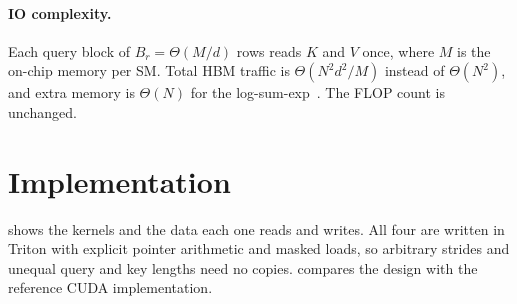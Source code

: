 \documentclass[10pt,twocolumn,letterpaper]{article}
\begin{document}
\paragraph{IO complexity.}
Each query block of $B_r = \Theta(M/d)$ rows reads $K$ and $V$ once, where
$M$ is the on-chip memory per SM. Total HBM traffic is $\Theta(N^2 d^2 / M)$
instead of $\Theta(N^2)$, and extra memory is $\Theta(N)$ for the
log-sum-exp~\cite{dao2022flashattention}. The FLOP count is unchanged.

\section{Implementation}
\label{sec:impl}

 shows the kernels and the data each one reads and writes.
All four are written in Triton with explicit pointer arithmetic and masked
loads, so arbitrary strides and unequal query and key lengths need no copies.
 compares the design with the reference CUDA implementation.
\end{document}

